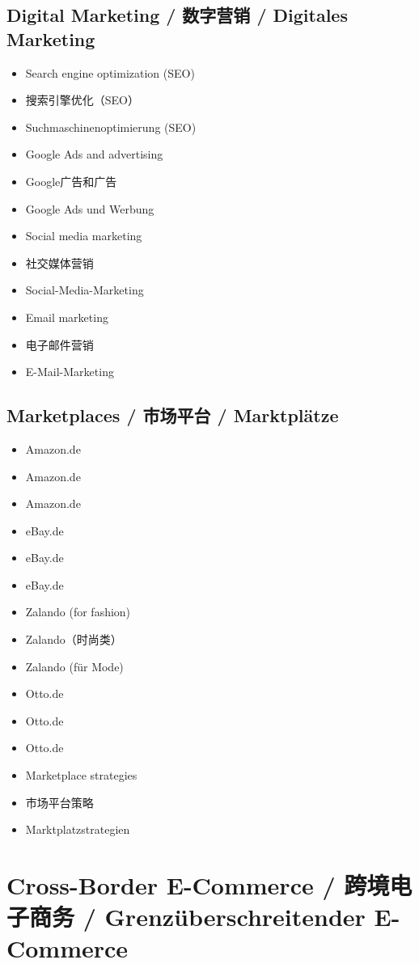 \subsection{Digital Marketing / 数字营销 / Digitales Marketing}
\begin{itemize}
    \item Search engine optimization (SEO)
    \item 搜索引擎优化（SEO）
    \item Suchmaschinenoptimierung (SEO)
    \item Google Ads and advertising
    \item Google广告和广告
    \item Google Ads und Werbung
    \item Social media marketing
    \item 社交媒体营销
    \item Social-Media-Marketing
    \item Email marketing
    \item 电子邮件营销
    \item E-Mail-Marketing
\end{itemize}

\subsection{Marketplaces / 市场平台 / Marktplätze}
\begin{itemize}
    \item Amazon.de
    \item Amazon.de
    \item Amazon.de
    \item eBay.de
    \item eBay.de
    \item eBay.de
    \item Zalando (for fashion)
    \item Zalando（时尚类）
    \item Zalando (für Mode)
    \item Otto.de
    \item Otto.de
    \item Otto.de
    \item Marketplace strategies
    \item 市场平台策略
    \item Marktplatzstrategien
\end{itemize}

\section{Cross-Border E-Commerce / 跨境电子商务 / Grenzüberschreitender E-Commerce}

